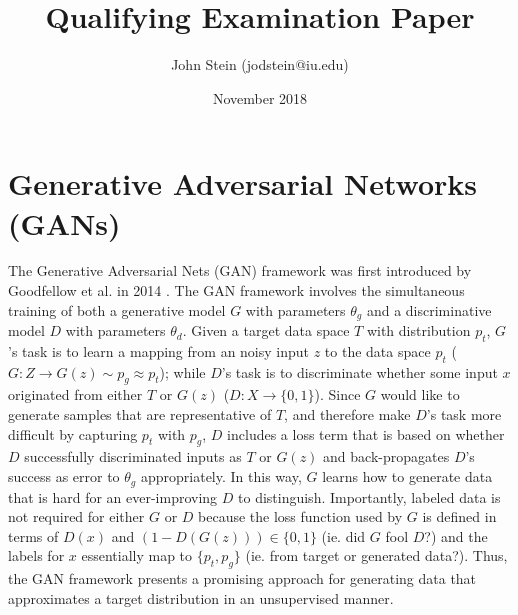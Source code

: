\documentclass[11pt]{article}
\title{Qualifying Examination Paper}
\author{John Stein (jodstein@iu.edu)}
\date{November 2018}
\begin{document}
\begin{titlepage}
    \null
    \nointerlineskip
    \vfill
    \let\snewpage \newpage
    \let\newpage \relax
    \maketitle
    \let \newpage \snewpage
    \vfill
    \thispagestyle{empty}
\end{titlepage}


\tableofcontents
\thispagestyle{empty}


\newpage
\setcounter{page}{1}
\section{Generative Adversarial Networks (GANs)}

The Generative Adversarial Nets (GAN) framework was first introduced by Goodfellow et al. in 2014 \cite{NIPS2014_5423}.  The GAN framework involves the simultaneous training of both a generative model $G$ with parameters $\theta_g$ and a discriminative model $D$ with parameters $\theta_d$.  Given a target data space $T$ with distribution $p_t$, $G$'s task is to learn a mapping from an noisy input $z$ to the data space $p_t$ ($G:Z \rightarrow G(z) \sim p_g \approx p_t$); while $D$'s task is to discriminate whether some input $x$ originated from either $T$ or $G(z)$ ($D: X \rightarrow \{0, 1\}$).  Since $G$ would like to generate samples that are representative of $T$, and therefore make $D$'s task more difficult by capturing $p_t$ with $p_g$, $D$ includes a loss term that is based on whether $D$ successfully discriminated inputs as $T$ or $G(z)$ and back-propagates $D$'s success as error to $\theta_g$ appropriately.  In this way, $G$ learns how to generate data that is hard for an ever-improving $D$ to distinguish.  Importantly, labeled data is not required for either $G$ or $D$ because the loss function used by $G$ is defined in terms of $D(x)$ and $(1-D(G(z))) \in \{0, 1\}$ (ie. did $G$ fool $D$?) and the labels for $x$ essentially map to $\{p_t, p_g\}$ (ie. from target or generated data?).  Thus, the GAN framework presents a promising approach for generating data that approximates a target distribution in an unsupervised manner.
\end{document}
